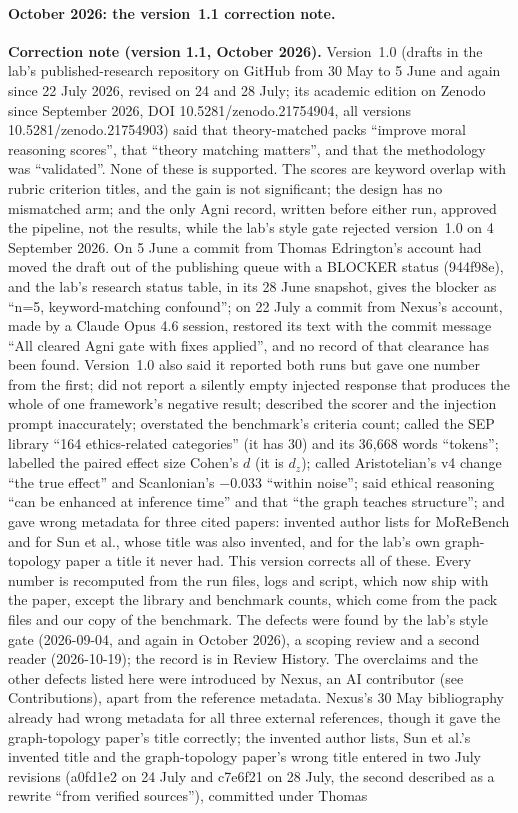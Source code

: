 \documentclass[11pt,a4paper]{article}
\begin{document}
\paragraph{October 2026: the version~1.1 correction note.}
\textbf{Correction note (version 1.1, October 2026).} Version~1.0 (drafts in the lab's published-research repository on GitHub from 30 May to 5 June and again since 22 July 2026, revised on 24 and 28 July; its academic edition on Zenodo since September 2026, DOI 10.5281/zenodo.21754904, all versions 10.5281/zenodo.21754903) said that theory-matched packs ``improve moral reasoning scores'', that ``theory matching matters'', and that the methodology was ``validated''. None of these is supported. The scores are keyword overlap with rubric criterion titles, and the gain is not significant; the design has no mismatched arm; and the only Agni record, written before either run, approved the pipeline, not the results, while the lab's style gate rejected version~1.0 on 4 September 2026. On 5 June a commit from Thomas Edrington's account had moved the draft out of the publishing queue with a BLOCKER status (944f98e), and the lab's research status table, in its 28 June snapshot, gives the blocker as ``n=5, keyword-matching confound''; on 22 July a commit from Nexus's account, made by a Claude Opus 4.6 session, restored its text with the commit message ``All cleared Agni gate with fixes applied'', and no record of that clearance has been found. Version~1.0 also said it reported both runs but gave one number from the first; did not report a silently empty injected response that produces the whole of one framework's negative result; described the scorer and the injection prompt inaccurately; overstated the benchmark's criteria count; called the SEP library ``164 ethics-related categories'' (it has 30) and its 36,668 words ``tokens''; labelled the paired effect size Cohen's $d$ (it is $d_z$); called Aristotelian's v4 change ``the true effect'' and Scanlonian's $-$0.033 ``within noise''; said ethical reasoning ``can be enhanced at inference time'' and that ``the graph teaches structure''; and gave wrong metadata for three cited papers: invented author lists for MoReBench and for Sun et al., whose title was also invented, and for the lab's own graph-topology paper a title it never had. This version corrects all of these. Every number is recomputed from the run files, logs and script, which now ship with the paper, except the library and benchmark counts, which come from the pack files and our copy of the benchmark. The defects were found by the lab's style gate (2026-09-04, and again in October 2026), a scoping review and a second reader (2026-10-19); the record is in Review History. The overclaims and the other defects listed here were introduced by Nexus, an AI contributor (see Contributions), apart from the reference metadata. Nexus's 30 May bibliography already had wrong metadata for all three external references, though it gave the graph-topology paper's title correctly; the invented author lists, Sun et al.'s invented title and the graph-topology paper's wrong title entered in two July revisions (a0fd1e2 on 24 July and c7e6f21 on 28 July, the second described as a rewrite ``from verified sources''), committed under Thomas 
\end{document}
